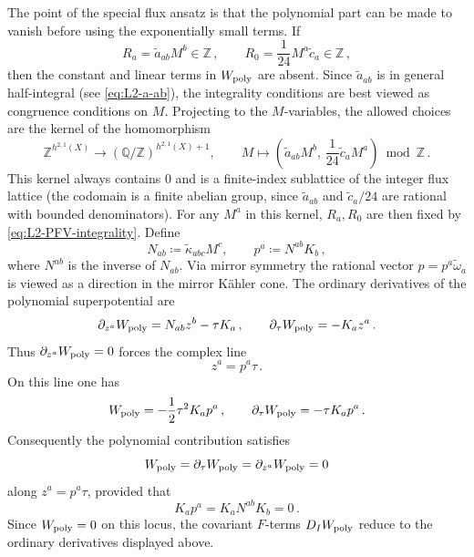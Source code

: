 The point of the special flux ansatz is that the polynomial part can
be made to vanish before using the exponentially small terms.  If
\begin{equation}\label{eq:L2-PFV-integrality}
    R_a=\widetilde a_{ab}M^b\in\mathbb Z\, ,
    \qquad
    R_0=\frac{1}{24}M^a\widetilde c_a\in\mathbb Z\, ,
\end{equation}
then the constant and linear terms in $W_{\rm poly}$ are absent.
Since $\widetilde a_{ab}$ is in general half-integral
(see \eqref{eq:L2-a-ab}), the integrality conditions are best viewed
as congruence conditions on $M$.  Projecting to the $M$-variables,
the allowed choices are the kernel of the homomorphism
\begin{equation}
    \mathbb Z^{h^{2,1}(X)}
    \longrightarrow
    (\mathbb Q/\mathbb Z)^{h^{2,1}(X)+1},\qquad
    M\longmapsto
    \left(\widetilde a_{ab}M^b,\,
    \frac{1}{24}\widetilde c_aM^a\right)\bmod\mathbb Z\, .
\end{equation}
This kernel always contains $0$ and is a finite-index
sublattice of the integer flux lattice (the codomain is a finite
abelian group, since $\widetilde a_{ab}$ and $\widetilde c_a/24$ are
rational with bounded denominators).  For any $M^a$ in this kernel,
$R_a,R_0$ are then fixed by \eqref{eq:L2-PFV-integrality}.
Define
\begin{equation}\label{eq:L2-PFV-N-p}
    N_{ab}\coloneqq \widetilde\kappa_{abc}M^c,
    \qquad
    p^a\coloneqq N^{ab}K_b\, ,
\end{equation}
where $N^{ab}$ is the inverse of $N_{ab}$.  Via mirror symmetry the
rational vector $p=p^a\widetilde\omega_a$ is viewed as a direction in
the mirror K\"ahler cone.  The ordinary
derivatives of the polynomial superpotential are
\begin{equation}\label{eq:L2-PFV-dWpoly}
    \partial_{z^a}W_{\rm poly}=N_{ab}z^b-\tau K_a\, ,
    \qquad
    \partial_\tau W_{\rm poly}=-K_az^a\, .
\end{equation}
Thus $\partial_{z^a}W_{\rm poly}=0$ forces the complex line
\begin{equation}\label{eq:L2-PFV-line}
    z^a=p^a\tau\, .
\end{equation}
On this line one has
\begin{equation}
    W_{\rm poly}
      =-\frac12\tau^2K_ap^a\, ,
    \qquad
    \partial_\tau W_{\rm poly}
      =-\tau K_ap^a\, .
\end{equation}
Consequently the polynomial contribution satisfies
\begin{equation}
    W_{\rm poly}=\partial_\tau W_{\rm poly}
      =\partial_{z^a}W_{\rm poly}=0
\end{equation}
along $z^a=p^a\tau$, provided that
\begin{equation}\label{eq:L2-PFV-null-condition}
    K_ap^a=K_aN^{ab}K_b=0\, .
\end{equation}
Since $W_{\rm poly}=0$ on this locus, the covariant
$F$-terms $D_IW_{\rm poly}$ reduce to the ordinary derivatives
displayed above.

